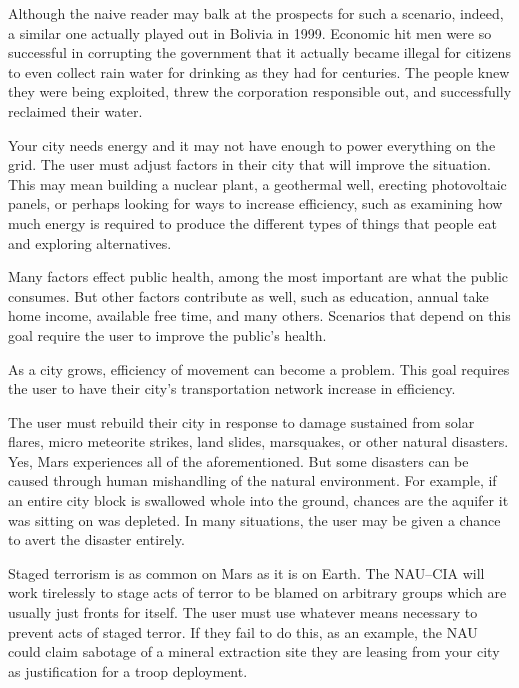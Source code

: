 Although the naive reader may balk at the prospects for such a scenario, indeed, a similar one actually played out in Bolivia in 1999. Economic hit men were so successful in corrupting the government that it actually became illegal for citizens to even collect rain water for drinking as they had for centuries. The people knew they were being exploited, threw the corporation responsible out, and successfully reclaimed their water.


Your city needs energy and it may not have enough to power everything on the grid. The user must adjust factors in their city that will improve the situation. This may mean building a nuclear plant, a geothermal well, erecting photovoltaic panels, or perhaps looking for ways to increase efficiency, such as examining how much energy is required to produce the different types of things that people eat and exploring alternatives.


Many factors effect public health, among the most important are what the public consumes. But other factors contribute as well, such as education, annual take home income, available free time, and many others. Scenarios that depend on this goal require the user to improve the public's health.


As a city grows, efficiency of movement can become a problem. This goal requires the user to have their city's transportation network increase in efficiency.


The user must rebuild their city in response to damage sustained from solar flares, micro meteorite strikes, land slides, marsquakes, or other natural disasters. Yes, Mars experiences all of the aforementioned. But some  disasters can be caused through human mishandling of the natural environment. For example, if an entire city block is swallowed whole into the ground, chances are the aquifer it was sitting on was depleted. In many situations, the user may be given a chance to avert the disaster entirely.


Staged terrorism is as common on Mars as it is on Earth. The NAU--CIA will work tirelessly to stage acts of terror to be blamed on arbitrary groups which are usually just fronts for itself. The user must use whatever means necessary to prevent acts of staged terror. If they fail to do this, as an example, the NAU could claim sabotage of a mineral extraction site they are leasing from your city as justification for a troop deployment.

